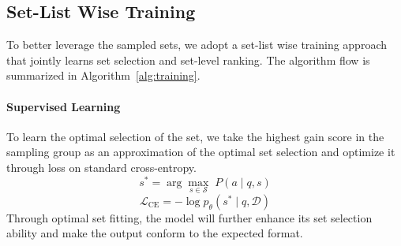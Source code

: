 \documentclass[11pt]{article}
\begin{document}
\subsection{Set-List Wise Training}
To better leverage the sampled sets, we adopt a set-list wise training approach that jointly learns set selection and set-level ranking. The algorithm flow is summarized in Algorithm~\ref{alg:training}.

\paragraph{Supervised Learning}
To learn the optimal selection of the set, we take the highest gain score in the sampling group as an approximation of the optimal set selection and optimize it through loss on standard cross-entropy. 
\begin{equation}
\label{eq:argmax-s}
s^{*}=\arg\max_{s\in\mathcal{S}} \; P(a\mid q,s)
\end{equation}
\begin{equation}
\label{eq:ce}
\mathcal{L}_{\text{CE}}
= -\log p_\theta(s^{*}\mid q,\mathcal{D})
\end{equation}
Through optimal set fitting, the model will further enhance its set selection ability and make the output conform to the expected format. 
\end{document}
